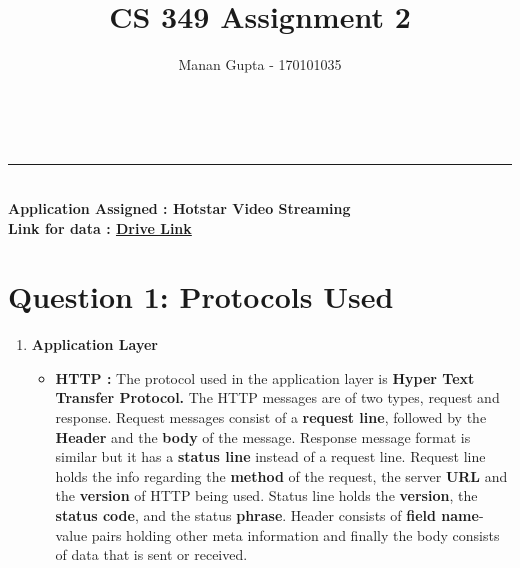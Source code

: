 \documentclass[a4paper,10pt]{article}
\title{CS 349 Assignment 2}
\author{Manan Gupta - 170101035}
\makeatletter
\renewcommand\maketitle{
	{\raggedright {
			\color{RoyalPurple}
		\begin{center}
			{\fontsize{22pt}{22pt} \bfseries \sffamily \@title } \qquad\qquad
			{\fontsize{22pt}{22pt} \bfseries \@author}\\[8ex]
\end{center}}} }
\makeatother
\begin{document}
\maketitle
\vspace{-1cm}
\hrule
\vspace{0.4cm}
\noindent
{\fontsize{18pt}{18pt} \bfseries \sffamily \color{RedViolet}\\Application Assigned : Hotstar Video Streaming\\
Link for data : \href{https://drive.google.com/drive/folders/14Bxr_9KKtqYI6y6nnKtwHtB8ZvGOMKf2?usp=sharing}{Drive Link}
}
\vspace{-0.3cm}
\section*{Question 1: Protocols Used}
\begin{enumerate}
	\item \textbf{\color{Magenta} \large Application Layer}
	\begin{itemize}
		\item \textbf{HTTP :} The protocol used in the application layer is \textbf{Hyper Text Transfer Protocol.} The HTTP messages are of two types, request and response. Request messages consist of a \textbf{request line}, followed by the \textbf{Header} and the \textbf{body} of the message. Response message format is similar but it has a \textbf{status line} instead of a request line. Request line holds the info regarding the \textbf{method} of the request, the server \textbf{URL} and the \textbf{version} of HTTP being used. Status line holds the \textbf{version}, the \textbf{status code}, and the status \textbf{phrase}. Header consists of \textbf{field name}-value pairs holding other meta information and finally the body consists of data that is sent or received.
		\begin{figure}[h]
			\centering

\end{figure}
\end{itemize}
\end{enumerate}
\end{document}
